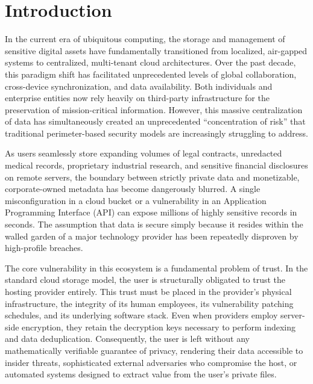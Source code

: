 \documentclass[runningheads]{llncs}
\begin{document}
\section{Introduction}
In the current era of ubiquitous computing, the storage and management of sensitive digital assets have fundamentally transitioned from localized, air-gapped systems to centralized, multi-tenant cloud architectures. Over the past decade, this paradigm shift has facilitated unprecedented levels of global collaboration, cross-device synchronization, and data availability. Both individuals and enterprise entities now rely heavily on third-party infrastructure for the preservation of mission-critical information. However, this massive centralization of data has simultaneously created an unprecedented ``concentration of risk'' that traditional perimeter-based security models are increasingly struggling to address.

As users seamlessly store expanding volumes of legal contracts, unredacted medical records, proprietary industrial research, and sensitive financial disclosures on remote servers, the boundary between strictly private data and monetizable, corporate-owned metadata has become dangerously blurred. A single misconfiguration in a cloud bucket or a vulnerability in an Application Programming Interface (API) can expose millions of highly sensitive records in seconds. The assumption that data is secure simply because it resides within the walled garden of a major technology provider has been repeatedly disproven by high-profile breaches.

The core vulnerability in this ecosystem is a fundamental problem of trust. In the standard cloud storage model, the user is structurally obligated to trust the hosting provider entirely. This trust must be placed in the provider's physical infrastructure, the integrity of its human employees, its vulnerability patching schedules, and its underlying software stack. Even when providers employ server-side encryption, they retain the decryption keys necessary to perform indexing and data deduplication. Consequently, the user is left without any mathematically verifiable guarantee of privacy, rendering their data accessible to insider threats, sophisticated external adversaries who compromise the host, or automated systems designed to extract value from the user's private files.
\end{document}
